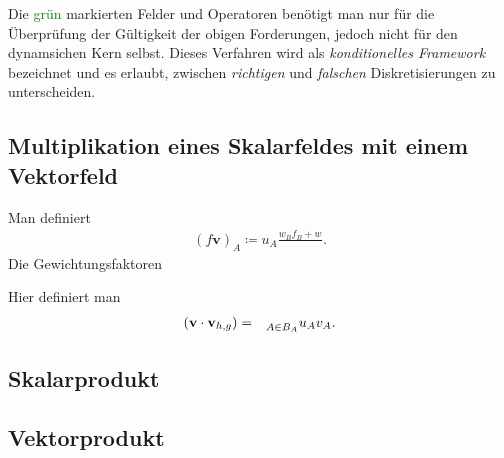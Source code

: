 \documentclass{book}
\let\sum\relax
\DeclareMathOperator*{\sum}{\raisebox{-3.5pt}{\scalebox{2}{\rotatebox{1}{{\bask Σ}}}}}
\begin{document}
%
Die \textcolor{green}{grün} markierten Felder und Operatoren benötigt man nur für die Überprüfung der Gültigkeit der obigen Forderungen, jedoch nicht für den dynamsichen Kern selbst. Dieses Verfahren wird als \textit{konditionelles Framework} bezeichnet und es erlaubt, zwischen \textit{richtigen} und \textit{falschen} Diskretisierungen zu unterscheiden.

\subsection{Multiplikation eines Skalarfeldes mit einem Vektorfeld}
\label{sec_multiplikation_eines_skalarfeldes_mit_einem_vektorfeld}

Man definiert
%
\begin{eqnarray}
\left(f\mathbf{v}\right)_A \coloneqq u_A\frac{w_Bf_B + w_{}}{}.
\end{eqnarray}
%
Die Gewichtungsfaktoren

Hier definiert man
%
\begin{eqnarray}
\left(\mathbf{v}\cdot\mathbf{v}_{h, g}\right) & = & \sum_{A\in B_A}^{}u_Av_A.
\end{eqnarray}

\subsection{Skalarprodukt}
\label{sec:skalarprodukt}

\subsection{Vektorprodukt}
\label{sec:vektorprodukt}
\end{document}
